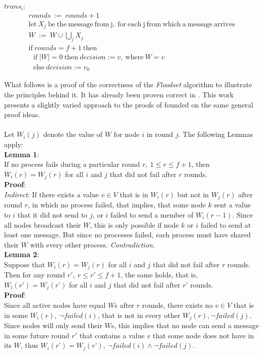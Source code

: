 \documentclass[fleqn]{article}
\begin{document}
\begin{mdframed}[nobreak=true, backgroundcolor=light-gray, roundcorner=10pt,leftmargin=1, rightmargin=1, innerleftmargin=15, innertopmargin=15,innerbottommargin=15, outerlinewidth=1, linecolor=light-gray]
\noindent $trans_i$:
\begin{gather*}
  rounds\ :=\ rounds+1\\
  \mathrm{let}\ X_j\ \mathrm{be\ the\ message\ from\ j,\ for\ each\ j\ from\ which\ a\ message\ arrives}\\
  W\ :=\ W \cup \bigcup_{j} X_j\\
  \mathrm{if}\ rounds = f+1\ \mathrm{then}\\
  \ \ \   \mathrm{if}\ |W| = 0\ \mathrm{then}\ decision := v,\ \mathrm{where}\ W = {v}\\
  \ \ \   \mathrm{else}\ decision := v_0
\end{gather*}
\end{mdframed}

\noindent What follows is a proof of the correctness of the \textit{Floodset} algorithm to illustrate the principles behind it. It has already been proven correct in \cite{refNancy}. This work presents a slightly varied approach to the proofs of \cite{refNancy} founded on the same general proof ideas.\\
\\
\noindent Let $W_i(j)$ denote the value of $W$ for node $i$ in round $j$. The following Lemmas apply:\\

\noindent \textbf{Lemma 1}:\\
If no process fails during a particular round $r,\ 1 \le r \le f + 1$, then $W_i(r) = W_j(r)$ for all $i$ and $j$ that did not fail after $r$ rounds.\\
\textbf{Proof}:\\
\textit{Indirect}: If there exists a value $v \in V$ that is in $W_i(r)$ but not in $W_j(r)$ after round $r$, in which no process failed, that implies, that some node $k$ sent a value to $i$ that it did not send to $j$, or $i$ failed to send a member of $W_i(r-1)$. Since all nodes broadcast their $W$, this is only possible if node $k$ or $i$ failed to send at least one message. But since no processes failed, each process must have shared their $W$ with every other process. \textit{Contradiction}. \\

\noindent \textbf{Lemma 2}:\\
Suppose that $W_i(r) = W_j(r)$ for all $i$ and $j$ that did not fail after $r$ rounds. Then for any round $r',\ r \le r' ≤ f + 1$, the same holds, that is, $W_i(r’) = W_j(r’)$ for all $i$ and $j$ that did not fail after $r’$ rounds.\\
\textbf{Proof}:\\
Since all active nodes have equal $W$s after $r$ rounds, there exists no $v \in V$ that is in some $W_i(r),\ \neg failed(i)$, that is not in every other $W_j(r), \neg failed(j)$.
Since nodes will only send their $W$s, this implies that no node can send a message in some future round $r'$ that contains a value $v$ that some node does not have in its $W$, thus $W_i(r’) = W_j(r’)$, $\neg failed(i) \land \neg failed(j)$.\\
\end{document}
